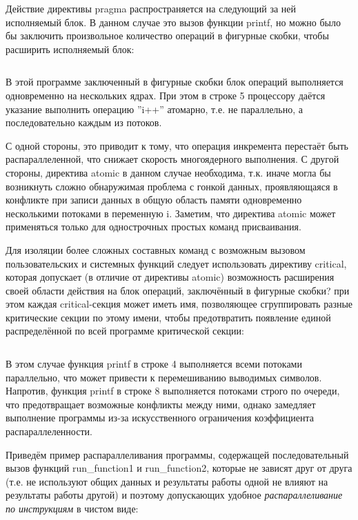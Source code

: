 Действие директивы pragma распространяется на следующий за ней исполняемый блок. В данном случае это вызов функции printf, но можно было бы заключить произвольное количество операций в фигурные скобки, чтобы расширить исполняемый блок:
\inputminted{c++}{listings/OpenMPExample2.cpp}

В этой программе заключенный в фигурные скобки блок операций выполняется одновременно на нескольких ядрах. При этом в строке 5 процессору даётся указание выполнить операцию ''i++'' атомарно, т.е. не параллельно, а последовательно каждым из потоков. 

С одной стороны, это приводит к тому, что операция инкремента перестаёт быть распараллеленной, что снижает скорость многоядерного выполнения. С другой стороны, директива atomic в данном случае необходима, т.к. иначе могла бы возникнуть сложно обнаружимая проблема с гонкой данных, проявляющаяся в конфликте при записи данных в общую область памяти одновременно несколькими потоками в переменную i. Заметим, что директива atomic может применяться только для однострочных простых команд присваивания. 

Для изоляции более сложных составных команд с возможным вызовом пользовательских и системных функций следует использовать директиву critical, которая допускает (в отличие от директивы atomic) возможность расширения своей области действия на блок операций, заключённый в фигурные скобки? при этом каждая critical-секция может иметь имя, позволяющее сгруппировать разные критические секции по этому имени, чтобы предотвратить появление единой распределённой по всей программе критической секции:
\inputminted{c++}{listings/OpenMPExample3.cpp}

В этом случае функция printf в строке 4 выполняется всеми потоками параллельно, что может привести к перемешиванию выводимых символов. Напротив, функция printf в строке 8 выполняется потоками строго по очереди, что предотвращает возможные конфликты между ними, однако замедляет выполнение программы из-за искусственного ограничения коэффициента распараллеленности.

Приведём пример распараллеливания программы, содержащей последовательный вызов функций run\_function1 и run\_function2, которые не зависят друг от друга (т.е. не используют общих данных и результаты работы одной не влияют на результаты работы другой) и поэтому допускающих удобное \textit{распараллеливание по инструкциям} в чистом виде:

\inputminted{c++}{listings/OpenMPExample4.cpp}

